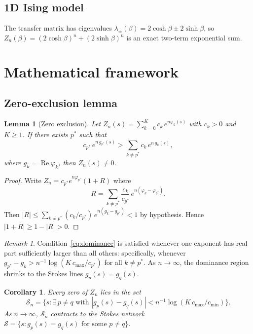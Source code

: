 \documentclass[12pt]{article}
\newtheorem{lemma}[theorem]{Lemma}
\newtheorem{corollary}[theorem]{Corollary}
\theoremstyle{definition}
\theoremstyle{remark}
\newtheorem{remark}[theorem]{Remark}
\newcommand{\re}{\operatorname{Re}}
\begin{document}
\subsection{1D Ising model}

The transfer matrix has eigenvalues
$\lambda_\pm(\beta) = 2\cosh\beta \pm 2\sinh\beta$, so
$Z_n(\beta) = (2\cosh\beta)^n + (2\sinh\beta)^n$ is an exact two-term
exponential sum.


\section{Mathematical framework}
\label{sec:math}

\subsection{Zero-exclusion lemma}

\begin{lemma}[Zero exclusion]\label{lem:exclusion}
Let $Z_n(s) = \sum_{k=0}^K c_k\,e^{n\varphi_k(s)}$ with $c_k > 0$
and $K \geq 1$.  If there exists $p^*$ such that
\begin{equation}\label{eq:dominance}
c_{p^*}\,e^{n\,g_{p^*}(s)} > \sum_{k \neq p^*} c_k\,e^{n\,g_k(s)},
\end{equation}
where $g_k = \re\varphi_k$, then $Z_n(s) \neq 0$.
\end{lemma}

\begin{proof}
Write $Z_n = c_{p^*} e^{n\varphi_{p^*}} (1 + R)$ where
\[
R = \sum_{k \neq p^*} \frac{c_k}{c_{p^*}}\, e^{n(\varphi_k - \varphi_{p^*})}.
\]
Then $|R| \leq \sum_{k \neq p^*} (c_k/c_{p^*})\,e^{n(g_k - g_{p^*})}
< 1$ by hypothesis.  Hence $|1 + R| \geq 1 - |R| > 0$.
\end{proof}

\begin{remark}
Condition~\eqref{eq:dominance} is satisfied whenever one exponent has
real part sufficiently larger than all others: specifically, whenever
$g_{p^*} - g_k > n^{-1}\log(K\,c_{\max}/c_{p^*})$ for all $k \neq p^*$.
As $n \to \infty$, the dominance region shrinks to the Stokes lines
$g_p(s) = g_q(s)$.
\end{remark}

\begin{corollary}\label{cor:stokes}
Every zero of $Z_n$ lies in the set
\[
\mathcal{S}_n = \{s : \exists\, p \neq q \text{ with }
|g_p(s) - g_q(s)| < n^{-1}\log(K\,c_{\max}/c_{\min})\}.
\]
As $n \to \infty$, $\mathcal{S}_n$ contracts to the Stokes network
$\mathcal{S} = \{s : g_p(s) = g_q(s) \text{ for some } p \neq q\}$.
\end{corollary}
\end{document}
